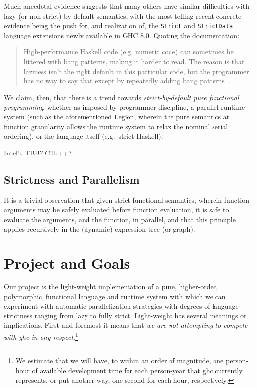 \documentclass{llncs}
\begin{document}
Much anecdotal evidence suggests that many others have similar difficulties
with lazy (or non-strict) by default semantics, with the most telling recent
concrete evidence being the push for, and realization of, the \texttt{Strict}
and \texttt{StrictData} language extensions newly available in GHC 8.0.
Quoting the documentation:
\begin{quote}
High-performance Haskell code (e.g. numeric code) can sometimes be littered
with bang patterns, making it harder to read. The reason is that laziness
isn't the right default in this particular code, but the programmer has no way
to say that except by repeatedly adding bang patterns~\cite{strict-strictdata}.
\end{quote}

We claim, then, that there is a trend towards \emph{strict-by-default pure
  functional programming}, whether as imposed by programmer discipline, a parallel
runtime system (such as the aforementioned Legion, wherein the pure semantics
at function granularity allows the runtime system to relax the nominal serial
ordering), or the language itself (e.g.\ strict Haskell).

Intel's TBB?  Cilk++?

\subsection{Strictness and Parallelism}

It is a trivial observation that given strict functional semantics, wherein
function arguments may be safely evaluated before function evaluation, it is
safe to evaluate the arguments, and the function, in parallel, and that this
principle applies recursively in the (dynamic) expression tree (or graph).

\section{Project and Goals}

Our project is the light-weight implementation of a pure, higher-order,
polymorphic, functional language and runtime system with which we can
experiment with automatic parallelization strategies with degrees of language
strictness ranging from lazy to fully strict.  Light-weight has several
meanings or implications.  First and foremost it means that \emph{we are not
  attempting to compete with ghc in any respect}.\footnote{We estimate that we
  will have, to within an order of magnitude, one person-hour of available
  development time for each person-year that ghc currently represents, or put
  another way, one second for each hour, respectively.}
\end{document}
